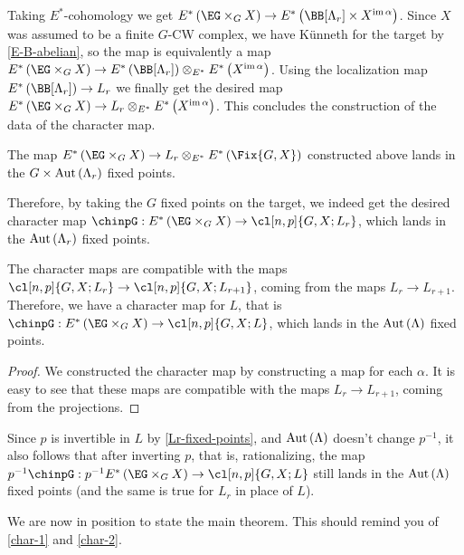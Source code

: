 Taking $E^*$-cohomology we get $E^*\left(\EG \times_G X\right) \to E^*\left(\BB[\Lambda_r] \times X^{\im \alpha}\right)$.
Since $X$ was assumed to be a finite $G$-CW complex, we have K\"unneth for the target by \ref{E-B-abelian}, so the map is equivalently a map $E^*\left(\EG \times_G X\right) \to E^*\left(\BB[\Lambda_r]\right) \otimes_{E^*} E^*\left(X^{\im \alpha}\right)$.
Using the localization map $E^*\left(\BB[\Lambda_r]\right) \to L_r$ we finally get the desired map $E^*\left(\EG \times_G X\right) \to L_r \otimes_{E^*} E^*\left(X^{\im \alpha}\right)$.
This concludes the construction of the data of the character map.

\begin{proposition}
	The map $E^*\left(\EG \times_G X\right) \to L_r \otimes_{E^*} E^*\left(\Fix{G,X}\right)$ constructed above lands in the $G \times \operatorname{Aut} \left(\Lambda_r\right)$ fixed points.
\end{proposition}

Therefore, by taking the $G$ fixed points on the target, we indeed get the desired character map $\chinpG: E^*\left(\EG \times_G X\right) \to \cl[n,p]{G,X; L_r}$, which lands in the $\operatorname{Aut} \left(\Lambda_r\right)$ fixed points.

\begin{proposition}
	The character maps are compatible with the maps $\cl[n,p]{G,X; L_r} \to \cl[n,p]{G,X; L_{r+1}}$, coming from the maps $L_r \to L_{r+1}$.
	Therefore, we have a character map for $L$, that is $\chinpG: E^*\left(\EG \times_G X\right) \to \cl[n,p]{G,X; L}$, which lands in the $\operatorname{Aut} \left(\Lambda\right)$ fixed points.
\end{proposition}

\begin{proof}
	We constructed the character map by constructing a map for each $\alpha$.
	It is easy to see that these maps are compatible with the maps $L_r \to L_{r+1}$, coming from the projections.
\end{proof}

Since $p$ is invertible in $L$ by \ref{Lr-fixed-points}, and $\operatorname{Aut} \left(\Lambda\right)$ doesn't change $p^{-1}$, it also follows that after inverting $p$, that is, rationalizing, the map $p^{-1} \chinpG: p^{-1} E^*\left(\EG \times_G X\right) \to \cl[n,p]{G,X; L}$ still lands in the $\operatorname{Aut} \left(\Lambda\right)$ fixed points (and the same is true for $L_r$ in place of $L$).

We are now in position to state the main theorem.
This should remind you of \ref{char-1} and \ref{char-2}.

